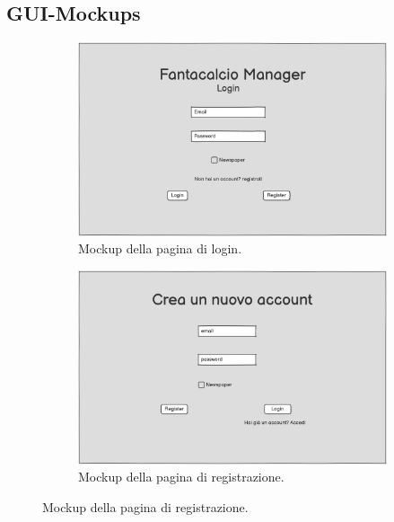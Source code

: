 \subsection{GUI-Mockups}
\begin{figure}[H]
    \centering

    \begin{subfigure}[b]{0.49\textwidth}
        \centering
        \includegraphics[width=\textwidth]{Resources/Mockups/Login.png}
        \caption{Mockup della pagina di login.}
        \label{fig:pagina_login}
    \end{subfigure}
    \hfill
    \begin{subfigure}[b]{0.49\textwidth}
        \centering
        \includegraphics[width=\textwidth]{Resources/Mockups/Registrazione.png}
        \caption{Mockup della pagina di registrazione.}
        \label{fig:pagina_registrazione}
    \end{subfigure}


\end{figure}
